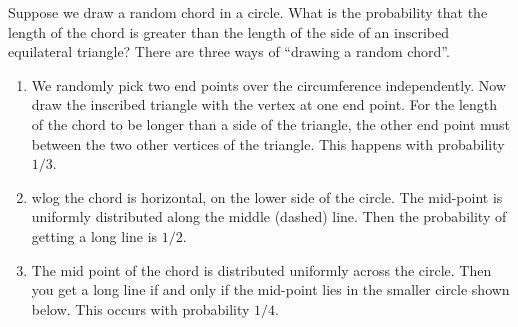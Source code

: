 \begin{note}
  \begin{field}
    \begin{eg}
      Suppose we draw a random chord in a circle. What is the probability that the length of the chord is greater than the length of the side of an inscribed equilateral triangle?
      There are three ways of ``drawing a random chord''.
      \begin{enumerate}
        \item We randomly pick two end points over the circumference independently. Now draw the inscribed triangle with the vertex at one end point. For the length of the chord to be longer than a side of the triangle, the other end point must between the two other vertices of the triangle. This happens with probability $1/3$.
          \begin{center}
          \end{center}
        \item wlog the chord is horizontal, on the lower side of the circle. The mid-point is uniformly distributed along the middle (dashed) line. Then the probability of getting a long line is $1/2$.
          \begin{center}
          \end{center}
        \item The mid point of the chord is distributed uniformly across the circle. Then you get a long line if and only if the mid-point lies in the smaller circle shown below. This occurs with probability $1/4$.

\end{enumerate}
\end{eg}
\end{field}
\end{note}
